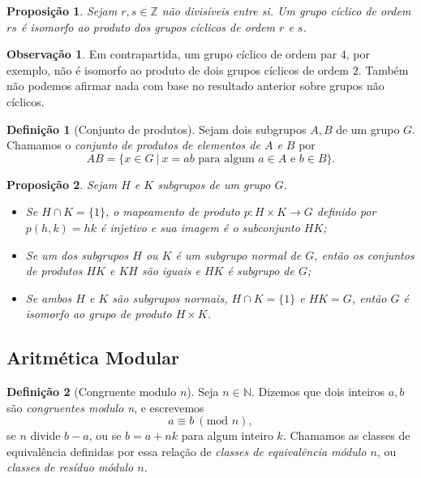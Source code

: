 \documentclass[a4paper,12pt]{report}
\theoremstyle{plain}
\newtheorem{proposicao}{Proposição}[section]
\theoremstyle{definition}
\newtheorem{definicao}{Definição}[section]
\newtheorem{observacao}{Observação}[section]
\begin{document}
\begin{proposicao}
	Sejam \(r,s\in\mathbb{Z}\) não divisíveis entre si.
	Um grupo cíclico de ordem \(rs\) é isomorfo ao produto dos grupos
	cíclicos de ordem \(r\) e \(s\).	
\end{proposicao}

\begin{observacao}
	Em contrapartida, um grupo cíclico de ordem par \(4\), por exemplo, não
	é isomorfo ao produto de dois grupos cíclicos de ordem \(2\). Também não
	podemos afirmar nada com base no resultado anterior sobre grupos não
	cíclicos.
\end{observacao}

\begin{definicao}[Conjunto de produtos]
	Sejam dois subgrupos \(A,B\) de um grupo \(G\).
	Chamamos o \emph{conjunto de produtos de elementos de \(A\) e \(B\)} por
	\[AB = \{x\in G \ | \ x = ab \text{ para algum }a\in A\text{ e }b\in B\}.\]
\end{definicao}

\begin{proposicao}
	Sejam \(H\) e \(K\) subgrupos de um grupo \(G\).
	\begin{itemize}
		\item Se \(H\cap K = \{1\}\), o mapeamento de produto
		\(p: H\times K\longrightarrow G\) definido por \(p(h,k) = hk\) é
		injetivo e sua imagem é o subconjunto \(HK\);
		\item Se um dos subgrupos
		\(H\) ou \(K\) é um subgrupo normal de \(G\), então os conjuntos de
		produtos \(HK\) e \(KH\) são iguais e \(HK\) é subgrupo de \(G\);
		\item Se ambos \(H\) e \(K\) são subgrupos normais, \(H\cap K = \{1\}\) e
		\(HK = G\), então \(G\) é isomorfo ao grupo de produto \(H\times K\).
	\end{itemize}
\end{proposicao}

\subsection{Aritmética Modular}

\begin{definicao}[Congruente modulo $n$]
	Seja \(n\in\mathbb{N}\). Dizemos que dois inteiros
	\(a,b\) são \emph{congruentes modulo n}, e escrevemos
	\[ a \equiv b \ (\text{mod }n),\]
	se \(n\) divide \(b-a\), ou se \(b = a + nk\) para algum inteiro \(k\).
	Chamamos as classes de equivalência definidas por essa relação de
	\emph{classes de equivalência módulo \(n\)}, ou \emph{classes de resíduo módulo \(n\)}.	
\end{definicao}
\end{document}
